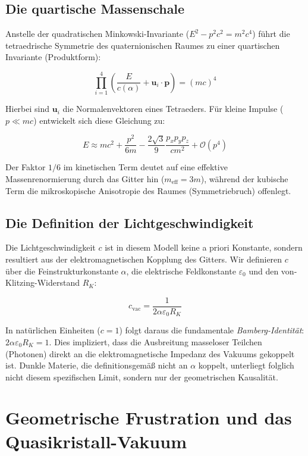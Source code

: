\documentclass[11pt, a4paper]{article}
\begin{document}
	\subsection{Die quartische Massenschale}
	Anstelle der quadratischen Minkowski-Invariante ($E^2 - p^2c^2 = m^2c^4$) führt die tetraedrische Symmetrie des quaternionischen Raumes zu einer quartischen Invariante (Produktform):
	
	\begin{equation}
		\prod_{i=1}^4 \left( \frac{E}{c(\alpha)} + \mathbf{u}_i \cdot \mathbf{p} \right) = (mc)^4
	\end{equation}
	
	Hierbei sind $\mathbf{u}_i$ die Normalenvektoren eines Tetraeders. Für kleine Impulse ($p \ll mc$) entwickelt sich diese Gleichung zu:
	
	\begin{equation}
		E \approx mc^2 + \frac{p^2}{6m} - \frac{2\sqrt{3}}{9}\frac{p_x p_y p_z}{c m^2} + \mathcal{O}(p^4)
	\end{equation}
	
	Der Faktor $1/6$ im kinetischen Term deutet auf eine effektive Massenrenormierung durch das Gitter hin ($m_{\text{eff}} = 3m$), während der kubische Term die mikroskopische Anisotropie des Raumes (Symmetriebruch) offenlegt.
	
	\subsection{Die Definition der Lichtgeschwindigkeit}
	Die Lichtgeschwindigkeit $c$ ist in diesem Modell keine a priori Konstante, sondern resultiert aus der elektromagnetischen Kopplung des Gitters. Wir definieren $c$ über die Feinstrukturkonstante $\alpha$, die elektrische Feldkonstante $\varepsilon_0$ und den von-Klitzing-Widerstand $R_K$:
	
	\begin{equation}
		c_{\text{vac}} = \frac{1}{2\alpha \varepsilon_0 R_K}
	\end{equation}
	
	In natürlichen Einheiten ($c=1$) folgt daraus die fundamentale \textit{Bamberg-Identität}: $2\alpha \varepsilon_0 R_K = 1$. Dies impliziert, dass die Ausbreitung masseloser Teilchen (Photonen) direkt an die elektromagnetische Impedanz des Vakuums gekoppelt ist. Dunkle Materie, die definitionsgemäß nicht an $\alpha$ koppelt, unterliegt folglich nicht diesem spezifischen Limit, sondern nur der geometrischen Kausalität.
	
	\section{Geometrische Frustration und das Quasikristall-Vakuum}
	
\end{document}
